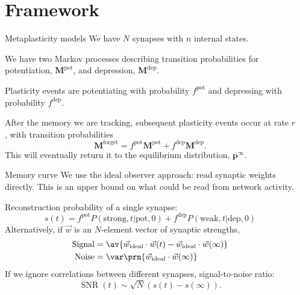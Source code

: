 \documentclass[final,hyperref={pdfpagelabels=false,bookmarks=false}]{beamer}
\DeclareMathOperator{\SNR}{SNR}
\newcommand{\pot}{^\text{pot}}
\newcommand{\dep}{^\text{dep}}
\newcommand{\frg}{^\text{forget}}
\newcommand{\eq}{\mathbf{p}^\infty}
\newcommand{\W}{\vec{w}}
\newcommand{\M}{\mathbf{M}}
\begin{document}
\begin{frame}{}
\begin{columns}[t]
\begin{column}{0.27\linewidth}
\end{column}

\begin{column}{0.37\linewidth}

\section{Framework}


\begin{block}{Metaplasticity models}
%
 We have $N$ synapses with $n$ internal states.

 We have two Markov processes describing transition probabilities for potentiation, $\M\pot$, and depression, $\M\dep$.

 \vp Plasticity events are potentiating with probability $f\pot$ and depressing with probability $f\dep$.

 \vp After the memory we are tracking, subsequent plasticity events occur at rate $r$, with transition probabilities
 \begin{equation*}
   \M\frg = f\pot\M\pot + f\dep\M\dep.
 \end{equation*}
 This will eventually return it to the equilibrium distribution, $\eq$.
%
\end{block}


\begin{block}{Memory curve}
%
 We use the ideal observer approach: read synaptic weights directly.
 This is an upper bound on what could be read from network activity.

 Reconstruction probability of a single synapse:
 \begin{equation*}
   s(t) = f\pot P(\text{strong},t|\text{pot},0) + f\dep P(\text{weak},t|\text{dep},0)
 \end{equation*}
 Alternatively, if $\W$ is an $N$-element vector of synaptic strengths,
 \begin{equation*}
   \begin{aligned}
     \text{Signal} &= \av{\W_\text{ideal} \cdot \W(t) -  \W_\text{ideal} \cdot \W(\infty)}\\
     \text{Noise} &= \var\prn{\W_\text{ideal} \cdot \W(\infty)}
   \end{aligned}
 \end{equation*}
 If we ignore correlations between different synapses, signal-to-noise ratio:
 \begin{equation*}
   \SNR(t) \sim \sqrt{N}(s(t)-s(\infty)).
 \end{equation*}
%
\end{block}



\end{column}
\end{columns}
\end{frame}
\end{document}
